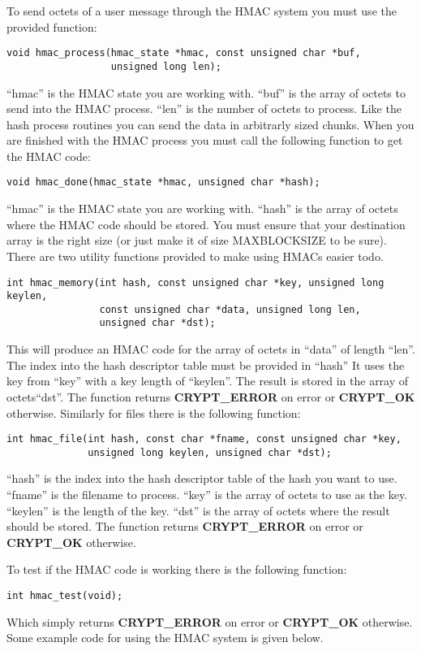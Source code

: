 \documentclass{book}
\begin{document}
To send octets of a user message through the HMAC system you must use the provided function:
\begin{verbatim}
void hmac_process(hmac_state *hmac, const unsigned char *buf,
                  unsigned long len);
\end{verbatim}
``hmac'' is the HMAC state you are working with. ``buf'' is the array of octets to send into the HMAC process.  ``len'' is the
number of octets to process.  Like the hash process routines you can send the data in arbitrarly sized chunks.  When you are 
finished with the HMAC process you must call the following function to get the HMAC code:
\begin{verbatim}
void hmac_done(hmac_state *hmac, unsigned char *hash);
\end{verbatim}
``hmac'' is the HMAC state you are working with.  ``hash'' is the array of octets where the HMAC code should be stored.  You
must ensure that your destination array is the right size (or just make it of size MAXBLOCKSIZE to be sure).  There are two
utility functions provided to make using HMACs easier todo.
\begin{verbatim}
int hmac_memory(int hash, const unsigned char *key, unsigned long keylen,
                const unsigned char *data, unsigned long len, 
                unsigned char *dst);
\end{verbatim}
This will produce an HMAC code for the array of octets in ``data'' of length ``len''.  The index into the hash descriptor table must be provided in ``hash'' 
It uses the key from ``key'' with a key length of ``keylen''.  The result is stored in the array of octets``dst''.  The function 
returns {\bf CRYPT\_ERROR} on error or {\bf CRYPT\_OK} otherwise.  Similarly for files there is the following function:
\begin{verbatim}
int hmac_file(int hash, const char *fname, const unsigned char *key,
              unsigned long keylen, unsigned char *dst);
\end{verbatim}
``hash'' is the index into the hash descriptor table of the hash you want to use.  ``fname'' is the filename to process.  ``key''
is the array of octets to use as the key.  ``keylen'' is the length of the key.  ``dst'' is the array of octets where the result
should be stored.  The function returns {\bf CRYPT\_ERROR} on error or {\bf CRYPT\_OK} otherwise.

To test if the HMAC code is working there is the following function:
\begin{verbatim}
int hmac_test(void);
\end{verbatim}
Which simply returns {\bf CRYPT\_ERROR} on error or {\bf CRYPT\_OK} otherwise.  Some example code for using the HMAC system is
given below.
\end{document}
